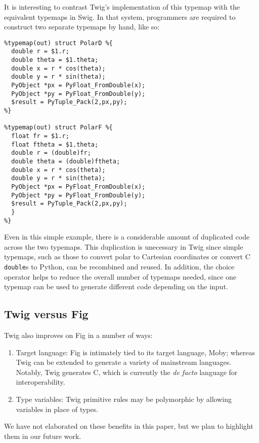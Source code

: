 It is interesting to contrast Twig's implementation of this typemap with the equivalent typemaps in Swig. In that system, programmers are required to construct two separate typemaps by hand, like so:

\begin{verbatim}
%typemap(out) struct PolarD %{
  double r = $1.r;
  double theta = $1.theta;
  double x = r * cos(theta);
  double y = r * sin(theta);
  PyObject *px = PyFloat_FromDouble(x);
  PyObject *py = PyFloat_FromDouble(y);
  $result = PyTuple_Pack(2,px,py);
%}

%typemap(out) struct PolarF %{
  float fr = $1.r;
  float ftheta = $1.theta;
  double r = (double)fr;
  double theta = (double)ftheta;
  double x = r * cos(theta);
  double y = r * sin(theta);
  PyObject *px = PyFloat_FromDouble(x);
  PyObject *py = PyFloat_FromDouble(y);
  $result = PyTuple_Pack(2,px,py);
  }
%}
\end{verbatim}

Even in this simple example, there is a considerable amount of duplicated code across the two typemaps. This duplication is unecessary in Twig since simple typemaps, such as those to convert polar to Cartesian coordinates or convert C \texttt{double}s to Python, can be recombined and reused. In addition, the choice operator helps to reduce the overall number of typemaps needed, since one typemap can be used to generate different code depending on the input.

\subsection{Twig versus Fig}

Twig also improves on Fig in a number of ways:

\begin{enumerate}

\item Target language: Fig is intimately tied to its target language, Moby; whereas Twig can be extended to generate a variety of mainstream languages. Notably, Twig generates C, which is currently the \emph{de facto} language for interoperability.

\item Type variables: Twig primitive rules may be polymorphic by allowing variables in place of types.

\end{enumerate}

We have not elaborated on these benefits in this paper, but we plan to highlight them in our future work.

